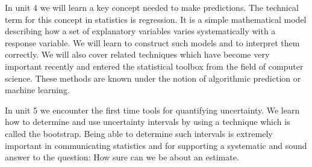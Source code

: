 \documentclass[
  letterpaper,
]{scrbook}
\begin{document}
\begin{tcolorbox}
\begin{tcolorbox}[enhanced jigsaw, toprule=.15mm, colbacktitle=quarto-callout-note-color!10!white, breakable, coltitle=black, rightrule=.15mm, bottomtitle=1mm, bottomrule=.15mm, titlerule=0mm, title=\textcolor{quarto-callout-note-color}{\faInfo}\hspace{0.5em}{Unit 4: Modelling relationships using regression and algorithmic
predictions}, arc=.35mm, leftrule=.75mm, toptitle=1mm, left=2mm, opacityback=0, opacitybacktitle=0.6, colframe=quarto-callout-note-color-frame, colback=white]
In unit 4 we will learn a key concept needed to make predictions. The
technical term for this concept in statistics is regression. It is a
simple mathematical model describing how a set of explanatory variables
varies systematically with a response variable. We will learn to
construct such models and to interpret them correctly. We will also
cover related techniques which have become very important recently and
entered the statistical toolbox from the field of computer science.
These methods are known under the notion of algorithmic prediction or
machine learning.
\end{tcolorbox}

\begin{tcolorbox}[enhanced jigsaw, toprule=.15mm, colbacktitle=quarto-callout-note-color!10!white, breakable, coltitle=black, rightrule=.15mm, bottomtitle=1mm, bottomrule=.15mm, titlerule=0mm, title=\textcolor{quarto-callout-note-color}{\faInfo}\hspace{0.5em}{Unit 5: How sure can we be about what is going on: Estimates and
Intervals.}, arc=.35mm, leftrule=.75mm, toptitle=1mm, left=2mm, opacityback=0, opacitybacktitle=0.6, colframe=quarto-callout-note-color-frame, colback=white]
In unit 5 we encounter the first time tools for quantifying uncertainty.
We learn how to determine and use uncertainty intervals by using a
technique which is called the bootstrap. Being able to determine such
intervals is extremely important in communicating statistics and for
supporting a systematic and sound answer to the question: How sure can
we be about an estimate.
\end{tcolorbox}


\end{tcolorbox}
\end{document}
